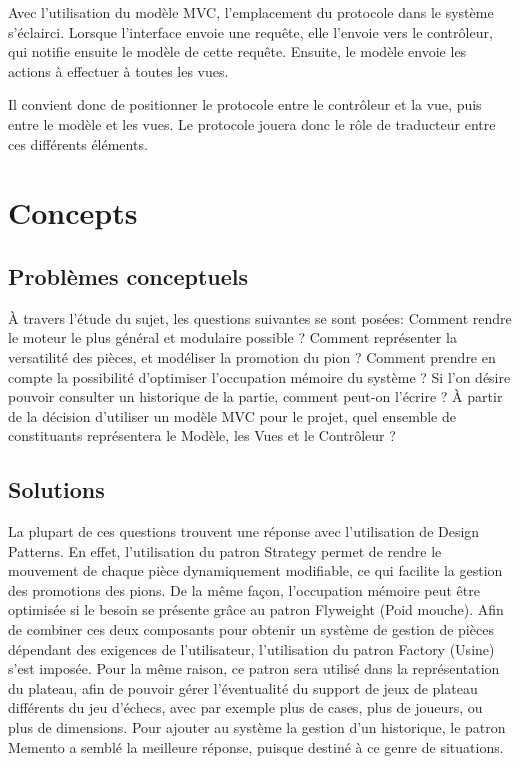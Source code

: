 \documentclass[11pt]{article}
\begin{document}
Avec l'utilisation du modèle MVC, l'emplacement du protocole dans le système s'éclairci. Lorsque l'interface envoie une requête, elle l'envoie vers le contrôleur, qui notifie ensuite le modèle de cette requête. Ensuite, le modèle envoie les actions à effectuer à toutes les vues. 

Il convient donc de positionner le protocole entre le contrôleur et la vue, puis entre le modèle et les vues. Le protocole jouera donc le rôle de traducteur entre ces différents éléments.
\newpage
\section{Concepts}
\label{sec-2}
\subsection{Problèmes conceptuels}
\label{sec-2-1}
À travers l'étude du sujet, les questions suivantes se sont posées: Comment rendre le moteur le plus général et modulaire possible ? Comment représenter la versatilité des pièces, et modéliser la promotion du pion ? Comment prendre en compte la possibilité d'optimiser l'occupation mémoire du système ? Si l'on désire pouvoir consulter un historique de la partie, comment peut-on l'écrire ? À partir de la décision d'utiliser un modèle MVC pour le projet, quel ensemble de constituants représentera le Modèle, les Vues et le Contrôleur ?

\subsection{Solutions}
\label{sec-2-2}
La plupart de ces questions trouvent une réponse avec l'utilisation de Design Patterns. En effet, l'utilisation du patron Strategy permet de rendre le mouvement de chaque pièce dynamiquement modifiable, ce qui facilite la gestion des promotions des pions. De la même façon, l'occupation mémoire peut être optimisée si le besoin se présente grâce au patron Flyweight (Poid mouche). Afin de combiner ces deux composants pour obtenir un système de gestion de pièces dépendant des exigences de l'utilisateur, l'utilisation du patron Factory (Usine) s'est imposée. Pour la même raison, ce patron sera utilisé dans la représentation du plateau, afin de pouvoir gérer l'éventualité du support de jeux de plateau différents du jeu d'échecs, avec par exemple plus de cases, plus de joueurs, ou plus de dimensions. Pour ajouter au système la gestion d'un historique, le patron Memento a semblé la meilleure réponse, puisque destiné à ce genre de situations.
\end{document}
